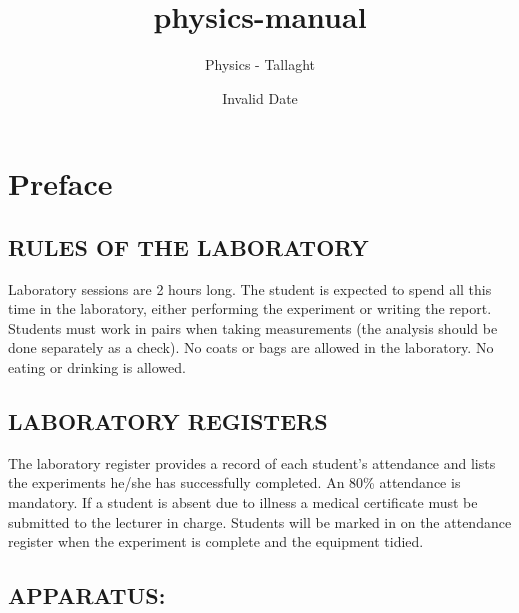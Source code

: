\documentclass[
  letterpaper,
  DIV=11,
  numbers=noendperiod]{scrreprt}
\title{physics-manual}
\author{Physics - Tallaght}
\date{Invalid Date}
\renewcommand*\contentsname{Table of contents}
\newcommand\contentsname{Table of contents}
\begin{document}
\maketitle

\renewcommand*\contentsname{Table of contents}
{
\hypersetup{linkcolor=}
\setcounter{tocdepth}{2}
\tableofcontents
}


\chapter*{Preface}\label{preface}


\section*{RULES OF THE LABORATORY}\label{rules-of-the-laboratory}


Laboratory sessions are 2 hours long. The student is expected to spend
all this time in the laboratory, either performing the experiment or
writing the report. Students must work in pairs when taking measurements
(the analysis should be done separately as a check). No coats or bags
are allowed in the laboratory. No eating or drinking is allowed.

\section*{LABORATORY REGISTERS}\label{laboratory-registers}


The laboratory register provides a record of each student's attendance
and lists the experiments he/she has successfully completed. An 80\%
attendance is mandatory. If a student is absent due to illness a medical
certificate must be submitted to the lecturer in charge. Students will
be marked in on the attendance register when the experiment is complete
and the equipment tidied.

\section*{APPARATUS:}\label{apparatus}
\end{document}
